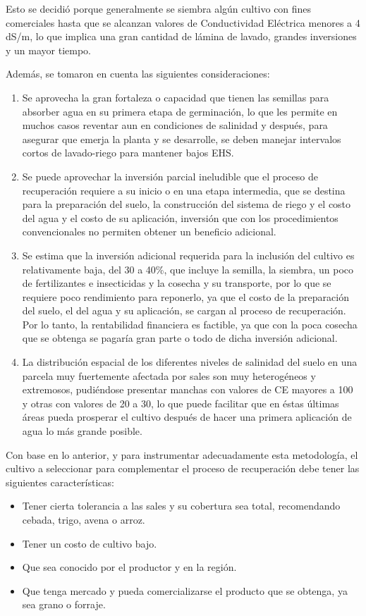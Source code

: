 Esto se decidió porque generalmente se siembra algún cultivo con fines
comerciales hasta que se alcanzan valores de Conductividad Eléctrica menores a 4
dS/m, lo que implica una gran cantidad de lámina de lavado, grandes inversiones y
un mayor tiempo.

Además, se tomaron en cuenta las siguientes consideraciones:
\begin{enumerate}
    \item Se aprovecha la gran fortaleza o capacidad que tienen las semillas para absorber agua en su primera etapa de germinación, lo que les permite en muchos casos reventar aun en condiciones de salinidad y después, para asegurar que emerja la planta y se desarrolle, se deben manejar intervalos cortos de lavado-riego para mantener bajos EHS.
    \item Se puede aprovechar la inversión parcial ineludible que el proceso de recuperación requiere a su inicio o en una etapa intermedia, que se destina para la preparación del suelo, la construcción del sistema de riego y el costo del agua y el costo de su aplicación, inversión que con los procedimientos convencionales no permiten obtener un beneficio adicional.
    \item Se estima que la inversión adicional requerida para la inclusión del cultivo es relativamente baja, del 30 a 40\%, que incluye la semilla, la siembra, un poco de fertilizantes e insecticidas y la cosecha y su transporte, por lo que se requiere poco rendimiento para reponerlo, ya que el costo de la preparación del suelo, el del agua y su aplicación, se cargan al proceso de recuperación. Por lo tanto, la rentabilidad financiera es factible, ya que con la poca cosecha que se obtenga se pagaría gran parte o todo de dicha inversión adicional.
    \item La distribución espacial de los diferentes niveles de salinidad del suelo en una parcela muy fuertemente afectada por sales son muy heterogéneos y extremosos, pudiéndose presentar manchas con valores de CE mayores a 100 y otras con valores de 20 a 30, lo que puede facilitar que en éstas últimas áreas pueda prosperar el cultivo después de hacer una primera aplicación de agua lo más grande posible.
\end{enumerate}
Con base en lo anterior, y para instrumentar adecuadamente esta metodología, el
cultivo a seleccionar para complementar el proceso de recuperación debe tener las
siguientes características:
\begin{itemize}
    \item Tener cierta tolerancia a las sales y su cobertura sea total, recomendando cebada, trigo, avena o arroz.
    \item Tener un costo de cultivo bajo.
    \item Que sea conocido por el productor y en la región.
    \item Que tenga mercado y pueda comercializarse el producto que se obtenga, ya sea grano o forraje.
\end{itemize}
